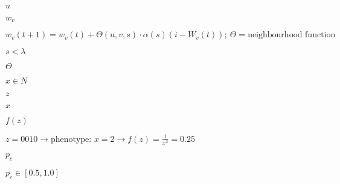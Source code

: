 \documentclass[10pt]{book}
\begin{document}
\begin{mdSnippets}
\begin{mdInlineSnippet}[7b774effe4a349c6dd82ad4f4f21d34c]
$u$\end{mdInlineSnippet}%
\begin{mdInlineSnippet}[d690d53f1c3c9670313e51ce35c9b5d0]%
$w_v$\end{mdInlineSnippet}%
\begin{mdInlineSnippet}[25b72824d54192a349079f87fe7c83bf]%
$w_v(t+1) = w_v(t) + \Theta (u, v, s) \cdot \alpha (s) (i - W_v(t)); ~ \Theta = \text{neighbourhood function}$\end{mdInlineSnippet}%
\begin{mdInlineSnippet}[305d9a2ffbf9368c7462367cf02e8f55]%
$s < \lambda$\end{mdInlineSnippet}%
\begin{mdInlineSnippet}[b9dce96eb3d5a71b28f9f198c28d2d1b]%
$\Theta$\end{mdInlineSnippet}%
\begin{mdInlineSnippet}[fb59b3958259c0dbd2356240d1f24969]%
$x \in N$\end{mdInlineSnippet}%
\begin{mdInlineSnippet}[fbade9e36a3f36d3d676c1b808451dd7]%
$z$\end{mdInlineSnippet}%
\begin{mdInlineSnippet}[9dd4e461268c8034f5c8564e155c67a6]%
$x$\end{mdInlineSnippet}%
\begin{mdInlineSnippet}[b23d8bcdb490736c53d5b677455a8cd2]%
$f(z)$\end{mdInlineSnippet}%
\begin{mdInlineSnippet}[67729d7838f7f947ee9e3a21819f196e]%
$z = 0010 \rightarrow \text{phenotype: } x = 2 \rightarrow f(z) = \frac{1}{x^2} = 0.25$\end{mdInlineSnippet}%
\begin{mdInlineSnippet}%
$p_c$\end{mdInlineSnippet}%
\begin{mdInlineSnippet}%
$p_c \in [0.5, 1.0]$\end{mdInlineSnippet}%

\end{mdSnippets}
\end{document}

